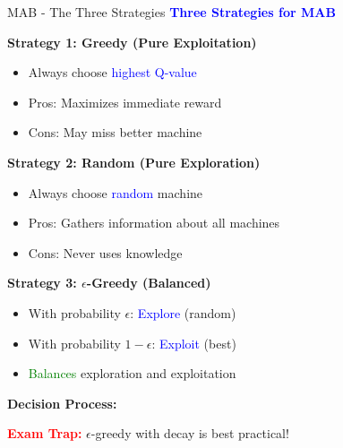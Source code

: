 \documentclass[8pt]{beamer}
\begin{document}
\begin{frame}{MAB - The Three Strategies}
\fontsize{6.5}{7.5}\selectfont
\textcolor{blue}{\textbf{Three Strategies for MAB}}

\textbf{Strategy 1: Greedy (Pure Exploitation)}
\begin{itemize}
\item Always choose \textcolor{blue}{highest Q-value}
\item Pros: Maximizes immediate reward
\item Cons: May miss better machine
\end{itemize}

\textbf{Strategy 2: Random (Pure Exploration)}
\begin{itemize}
\item Always choose \textcolor{blue}{random} machine
\item Pros: Gathers information about all machines
\item Cons: Never uses knowledge
\end{itemize}

\textbf{Strategy 3: $\epsilon$-Greedy (Balanced)}
\begin{itemize}
\item With probability $\epsilon$: \textcolor{blue}{Explore} (random)
\item With probability $1-\epsilon$: \textcolor{blue}{Exploit} (best)
\item \textcolor{green}{Balances} exploration and exploitation
\end{itemize}

\textbf{Decision Process:}
\begin{center}
\end{center}

\textcolor{red}{\textbf{Exam Trap:}} $\epsilon$-greedy with decay is best practical!
\end{frame}
\end{document}
